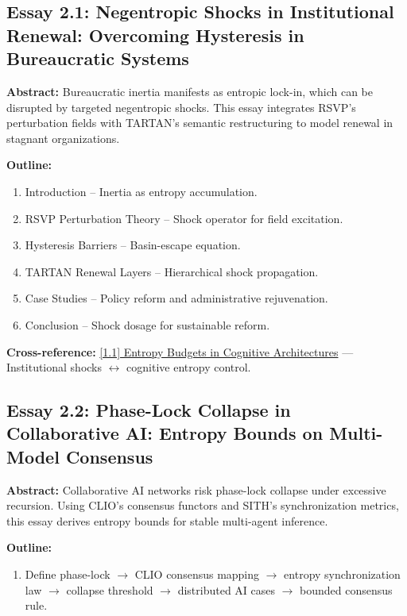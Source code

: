 \documentclass[12pt,a4paper]{article}
\begin{document}
\subsection{Essay 2.1: Negentropic Shocks in Institutional Renewal: Overcoming Hysteresis in Bureaucratic Systems}
\label{sec:essay2-1}

\textbf{Abstract:} Bureaucratic inertia manifests as entropic lock-in, which can be disrupted by targeted negentropic shocks. This essay integrates RSVP’s perturbation fields with TARTAN’s semantic restructuring to model renewal in stagnant organizations.

\textbf{Outline:}
\begin{enumerate}
\item Introduction -- Inertia as entropy accumulation.
\item RSVP Perturbation Theory -- Shock operator for field excitation.
\item Hysteresis Barriers -- Basin-escape equation.
\item TARTAN Renewal Layers -- Hierarchical shock propagation.
\item Case Studies -- Policy reform and administrative rejuvenation.
\item Conclusion -- Shock dosage for sustainable reform.
\end{enumerate}

\textbf{Cross-reference:} \hyperref[sec:essay1-1]{[1.1] Entropy Budgets in Cognitive Architectures} --- Institutional shocks $\leftrightarrow$ cognitive entropy control.

\subsection{Essay 2.2: Phase-Lock Collapse in Collaborative AI: Entropy Bounds on Multi-Model Consensus}
\label{sec:essay2-2}

\textbf{Abstract:} Collaborative AI networks risk phase-lock collapse under excessive recursion. Using CLIO’s consensus functors and SITH’s synchronization metrics, this essay derives entropy bounds for stable multi-agent inference.

\textbf{Outline:}
\begin{enumerate}
\item Define phase-lock $\to$ CLIO consensus mapping $\to$ entropy synchronization law $\to$ collapse threshold $\to$ distributed AI cases $\to$ bounded consensus rule.
\end{enumerate}
\end{document}
